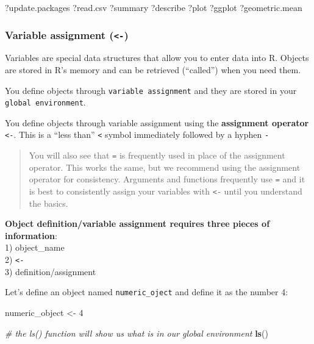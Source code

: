 \documentclass[]{article}
\newenvironment{Shaded}{\begin{snugshade}}{\end{snugshade}}
\newcommand{\KeywordTok}[1]{\textcolor[rgb]{0.13,0.29,0.53}{\textbf{#1}}}
\newcommand{\DecValTok}[1]{\textcolor[rgb]{0.00,0.00,0.81}{#1}}
\newcommand{\StringTok}[1]{\textcolor[rgb]{0.31,0.60,0.02}{#1}}
\newcommand{\CommentTok}[1]{\textcolor[rgb]{0.56,0.35,0.01}{\textit{#1}}}
\newcommand{\NormalTok}[1]{#1}
\begin{document}
\begin{Shaded}
\begin{Highlighting}[]
\NormalTok{?update.packages}
\NormalTok{?read.csv}
\NormalTok{?summary}
\NormalTok{?describe}
\NormalTok{?plot}
\NormalTok{?ggplot}
\NormalTok{?geometric.mean}
\end{Highlighting}
\end{Shaded}

\subsubsection{\texorpdfstring{Variable assignment
(\texttt{\textless{}-})}{Variable assignment (\textless{}-)}}\label{variable-assignment--}

Variables are special data structures that allow you to enter data into
R. Objects are stored in R's memory and can be retrieved (``called'')
when you need them.

You define objects through \texttt{variable\ assignment} and they are
stored in your \texttt{global\ environment}.

You define objects through variable assignment using the
\textbf{assignment operator} \texttt{\textless{}-}. This is a ``less
than'' \texttt{\textless{}} symbol immediately followed by a hyphen
\texttt{-}

\begin{quote}
You will also see that \texttt{=} is frequently used in place of the
assignment operator. This works the same, but we recommend using the
assignment operator for consistency. Arguments and functions frequently
use \texttt{=} and it is best to consistently assign your variables with
\texttt{\textless{}-} until you understand the basics.
\end{quote}

\textbf{Object definition/variable assignment requires three pieces of
information}:\\
1) object\_name\\
2) \texttt{\textless{}-}\\
3) definition/assignment

Let's define an object named \texttt{numeric\_oject} and define it as
the number 4:

\begin{Shaded}
\begin{Highlighting}[]
\NormalTok{numeric_object <-}\StringTok{ }\DecValTok{4}

\CommentTok{# the ls() function will show us what is in our global environment}
\KeywordTok{ls}\NormalTok{()}
\end{Highlighting}
\end{Shaded}
\end{document}
